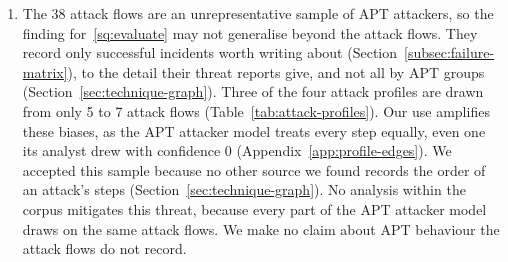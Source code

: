 \documentclass{cshonours}
\begin{document}
\begin{enumerate}[resume*=threats]
\item\label{thr:corpus} The 38 attack flows are an unrepresentative sample
of APT attackers, so the finding for~\ref{sq:evaluate} may not generalise
beyond the attack flows. They record only successful incidents worth writing
about (Section~\ref{subsec:failure-matrix}), to the detail their threat
reports give, and not all by APT groups (Section~\ref{sec:technique-graph}). Three of the
four attack profiles are drawn from only 5 to 7 attack flows
(Table~\ref{tab:attack-profiles}). Our use amplifies these biases, as the APT
attacker model treats every step equally, even one its analyst drew with
confidence 0 (Appendix~\ref{app:profile-edges}). We accepted this sample
because no other source we found records the order of an attack's steps
(Section~\ref{sec:technique-graph}). No analysis within the corpus
mitigates this threat, because every part of the APT attacker model draws on
the same attack flows. We make no claim about APT behaviour the attack flows do
not record.


\end{enumerate}
\end{document}
